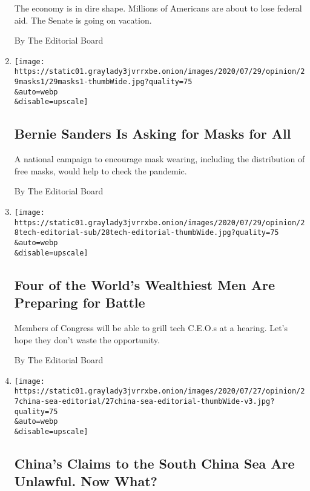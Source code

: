 \begin{enumerate}
  The economy is in dire shape. Millions of Americans are about to lose
  federal aid. The Senate is going on vacation.

  By The Editorial Board
\item
  \href{/2020/07/29/opinion/us-coronavirus-masks.html}{}

  \texttt{[image: https://static01.graylady3jvrrxbe.onion/images/2020/07/29/opinion/29masks1/29masks1-thumbWide.jpg?quality=75\\\&auto=webp\\\&disable=upscale]}

  \hypertarget{bernie-sanders-is-asking-for-masks-for-all}{%
  \subsection{Bernie Sanders Is Asking for Masks for
  All}\label{bernie-sanders-is-asking-for-masks-for-all}}

  A national campaign to encourage mask wearing, including the
  distribution of free masks, would help to check the pandemic.

  By The Editorial Board
\item
  \href{/2020/07/28/opinion/tech-ceo-hearing-congress.html}{}

  \texttt{[image: https://static01.graylady3jvrrxbe.onion/images/2020/07/29/opinion/28tech-editorial-sub/28tech-editorial-thumbWide.jpg?quality=75\\\&auto=webp\\\&disable=upscale]}

  \hypertarget{four-of-the-worlds-wealthiest-men-are-preparing-for-battle}{%
  \subsection{Four of the World's Wealthiest Men Are Preparing for
  Battle}\label{four-of-the-worlds-wealthiest-men-are-preparing-for-battle}}

  Members of Congress will be able to grill tech C.E.O.s at a hearing.
  Let's hope they don't waste the opportunity.

  By The Editorial Board
\item
  \href{/2020/07/27/opinion/pompeo-south-china-sea.html}{}

  \texttt{[image: https://static01.graylady3jvrrxbe.onion/images/2020/07/27/opinion/27china-sea-editorial/27china-sea-editorial-thumbWide-v3.jpg?quality=75\\\&auto=webp\\\&disable=upscale]}

  \hypertarget{chinas-claims-to-the-south-china-sea-are-unlawful-now-what}{%
  \subsection{China's Claims to the South China Sea Are Unlawful. Now
  What?}\label{chinas-claims-to-the-south-china-sea-are-unlawful-now-what}}


\end{enumerate}
